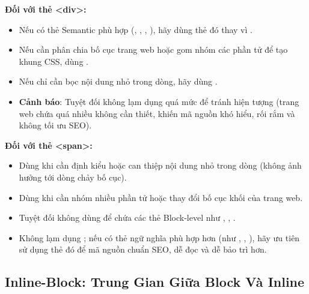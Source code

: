 \begin{conceptBox}
\textbf{Đối với thẻ <div>:}
\begin{itemize}[leftmargin=1.5em, itemsep=2pt, parsep=0pt]
    \item Nếu có thẻ Semantic phù hợp (, , , ), hãy dùng thẻ đó thay vì .
    \item Nếu cần phân chia bố cục trang web hoặc gom nhóm các phần tử để tạo khung CSS, dùng .
    \item Nếu chỉ cần bọc nội dung nhỏ trong dòng, hãy dùng .
    \item \textbf{Cảnh báo}: Tuyệt đối không lạm dụng  quá mức để tránh hiện tượng  (trang web chứa quá nhiều  không cần thiết, khiến mã nguồn khó hiểu, rối rắm và không tối ưu SEO).
\end{itemize}

\vspace{4pt}
\textbf{Đối với thẻ <span>:}
\begin{itemize}[leftmargin=1.5em, itemsep=2pt, parsep=0pt]
    \item Dùng  khi cần định kiểu hoặc can thiệp nội dung nhỏ trong dòng (không ảnh hưởng tới dòng chảy bố cục).
    \item Dùng  khi cần nhóm nhiều phần tử hoặc thay đổi bố cục khối của trang web.
    \item Tuyệt đối không dùng  để chứa các thẻ Block-level như , , .
    \item Không lạm dụng ; nếu có thẻ ngữ nghĩa phù hợp hơn (như , , ), hãy ưu tiên sử dụng thẻ đó để mã nguồn chuẩn SEO, dễ đọc và dễ bảo trì hơn.
\end{itemize}
\end{conceptBox}

\subsection{Inline-Block: Trung Gian Giữa Block Và Inline}

